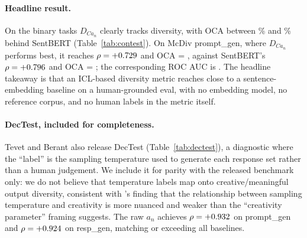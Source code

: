 \paragraph{Headline result.} On the binary tasks $D_{Ca_n}$ clearly tracks diversity, with OCA between \tevetCxAnVsSentBertOCAMinPct\% and \tevetCxAnVsSentBertOCAMaxPct\% behind SentBERT (Table~\ref{tab:contest}).
On McDiv prompt\_gen, where $D_{Ca_n}$ performs best, it reaches $\rho = +0.729{}$ and OCA = \tevetMcDivPromptGenCxAnOCA{}, against SentBERT's $\rho = +0.796{}$ and OCA = \tevetMcDivPromptGenSentBertOCA{}; the corresponding ROC AUC is \tevetMcDivPromptGenAUC{}.
The headline takeaway is that an ICL-based diversity metric reaches close to a sentence-embedding baseline on a human-grounded eval, with no embedding model, no reference corpus, and no human labels in the metric itself.

\paragraph{DecTest, included for completeness.} Tevet and Berant also release DecTest (Table~\ref{tab:dectest}), a diagnostic where the ``label'' is the sampling temperature used to generate each response set rather than a human judgement.
We include it for parity with the released benchmark only: we do not believe that temperature labels map onto creative/meaningful output diversity, consistent with \citet{peeperkorn2024temperature}'s finding that the relationship between sampling temperature and creativity is more nuanced and weaker than the ``creativity parameter'' framing suggests.
The raw $a_n$ achieves $\rho = +0.932{}$ on prompt\_gen and $\rho = +0.924{}$ on resp\_gen, matching or exceeding all baselines.

\begin{table}[t]
\centering
\caption{DecTest results: Spearman $\rho$ between sampling temperature and each metric score (1000 samples, no\_hds).
Reported for parity with Tevet and Berant; the labels here are sampling temperatures rather than human judgements, so DecTest is not part of the framing for $D_{Ca_n}$.
That $a_n$ tracks temperature is mechanically unsurprising: $a_n$ is a conditional-entropy quantity, and sampling temperature directly scales the entropy of the policy, so a positive $\rho$ here is a sanity check rather than evidence about creative diversity; \citet{peeperkorn2024temperature} likewise find only a weak relationship between temperature and creativity in LLM outputs.}
\label{tab:dectest}
\small

\end{table}

